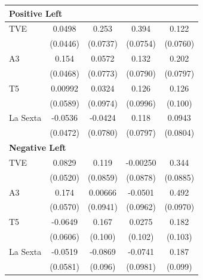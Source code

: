 \documentclass[12pt]{article}
\begin{document}
\begin{table}[htbp]
\begin{tabular}{lcccc}
			\multicolumn{5}{l}{\textbf{Positive Left}}\\
			\hline
			TVE       & 0.0498        & 0.253\sym{***}& 0.394\sym{***}& 0.122         \\
			& (0.0446)      & (0.0737)      & (0.0754)      & (0.0760)      \\
			A3        & 0.154\sym{**} & 0.0572        & 0.132         & 0.202\sym{*}  \\
			& (0.0468)      & (0.0773)      & (0.0790)      & (0.0797)      \\
			T5        & 0.00992       & 0.0324        & 0.126         & 0.126         \\
			& (0.0589)      & (0.0974)      & (0.0996)      & (0.100)       \\
			La Sexta  & -0.0536       & -0.0424       & 0.118         & 0.0943        \\
			& (0.0472)      & (0.0780)      & (0.0797)      & (0.0804)      \\
			\hline
			
			\multicolumn{5}{l}{\textbf{Negative Left}}\\
			\hline
			TVE       & 0.0829        & 0.119         & -0.00250      & 0.344\sym{***}\\
			& (0.0520)      & (0.0859)      & (0.0878)      & (0.0885)      \\
			A3        & 0.174\sym{**} & 0.00666       & -0.0501       & 0.492\sym{***}\\
			& (0.0570)      & (0.0941)      & (0.0962)      & (0.0970)      \\
			T5        & -0.0649       & 0.167\sym{*}  & 0.0275        & 0.182\sym{*}  \\
			& (0.0606)      & (0.100)       & (0.102)       & (0.103)       \\
			La Sexta  & -0.0519       & -0.0869       & -0.0741       & 0.187\sym{*}  \\
			& (0.0581)      & (0.096)       & (0.0981)      & (0.099)       \\
			\hline
			

\end{tabular}
\end{table}
\end{document}
